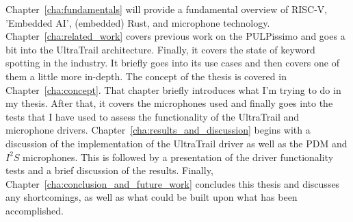 Chapter~\ref{cha:fundamentals} will provide a fundamental overview of RISC-V, 'Embedded AI', (embedded) Rust, and microphone technology.\\
Chapter~\ref{cha:related_work} covers previous work on the PULPissimo \cite{pulpissimo} and goes a bit into the UltraTrail architecture.
Finally, it covers the state of keyword spotting in the industry.
It briefly goes into its use cases and then covers one of them a little more in-depth.
The concept of the thesis is covered in Chapter~\ref{cha:concept}.
That chapter briefly introduces what I'm trying to do in my thesis.
After that, it covers the microphones used and finally goes into the tests that I have used
to assess the functionality of the UltraTrail and microphone drivers.
Chapter~\ref{cha:results_and_discussion} begins with a discussion of the implementation
of the UltraTrail driver as well as the PDM and $I^2S$ microphones.
This is followed by a presentation of the driver functionality tests and a brief discussion of the results.
Finally, Chapter~\ref{cha:conclusion_and_future_work} concludes this thesis and discusses any shortcomings,
as well as what could be built upon what has been accomplished.

